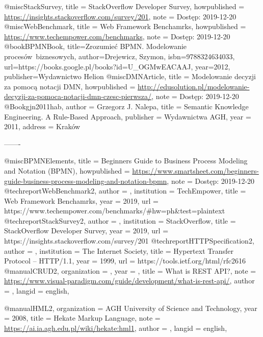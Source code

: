 @misc{StackSurvey,
  title = {StackOverflow Developer Survey},
  howpublished = {\url{https://insights.stackoverflow.com/survey/201}},
  note = {Dostęp: 2019-12-20}
}
@misc{WebBenchmark,
  title = {Web Framework Benchamrks},
  howpublished = {\url{https://www.techempower.com/benchmarks}},
  note = {Dostęp: 2019-12-20}
}
@book{BPMNBook,
  title={Zrozumie{\'c} BPMN. Modelowanie proces{\'o}w~biznesowych},
  author={Drejewicz, Szymon},
  isbn={9788324634033},
  url={https://books.google.pl/books?id=U\_OGMwEACAAJ},
  year={2012},
  publisher={Wydawnictwo Helion}
}
@misc{DMNArticle,
  title = {Modelowanie decyzji za pomocą notacji DMN},
  howpublished = {\url{http://edusolution.pl/modelowanie-decyzji-za-pomoca-notacji-dmn-czesc-pierwsza/}},
  note = {Dostęp: 2019-12-20}
}
@Book{gjn2011hab,
  author = {Grzegorz J. Nalepa},
  title = {Semantic Knowledge Engineering. A Rule-Based Approach},
  publisher = {Wydawnictwa AGH},
  year = 2011,
  address = {Krak\'ow}
}













-------

@misc{BPMNElements,
  title = {Beginners Guide to Business Process Modeling and Notation (BPMN)},
  howpublished = {\url{https://www.smartsheet.com/beginners-guide-business-process-modeling-and-notation-bpmn}},
  note = {Dostęp: 2019-12-20}
}
@techreport{WebBenchmark2,
	author = {},
	institution = {TechEmpower},
	title = {{Web Framework Benchamrks}},
	year = {2019},
	url = {https://www.techempower.com/benchmarks/#hw=ph&test=plaintext}
}
@techreport{StackSurvey2,
	author = {},
	institution = {StackOverflow},
	title = {{StackOverflow Developer Survey}},
	year = {2019},
	url = {https://insights.stackoverflow.com/survey/201}
}
@techreport{HTTPSpecification2,
	author = {},
	institution = {The Internet Society},
	title = {{Hypertext Transfer Protocol -- HTTP/1.1}},
	year = {1999},
	url = {https://tools.ietf.org/html/rfc2616}
}
@manual{CRUD2,
	organization = {},
	year = {},
	title = {{What is REST API?}},
	note = {{\\\url{https://www.visual-paradigm.com/guide/development/what-is-rest-api/}}},
	author = {},
	langid = {english},
}


@manual{HML2,
	organization = {AGH University of Science and Technology},
	year = {2008},
	title = {{Hekate Markup Language}},
	note = {\\\url{https://ai.ia.agh.edu.pl/wiki/hekate:hml1}},
	author = {},
	langid = {english},
}

